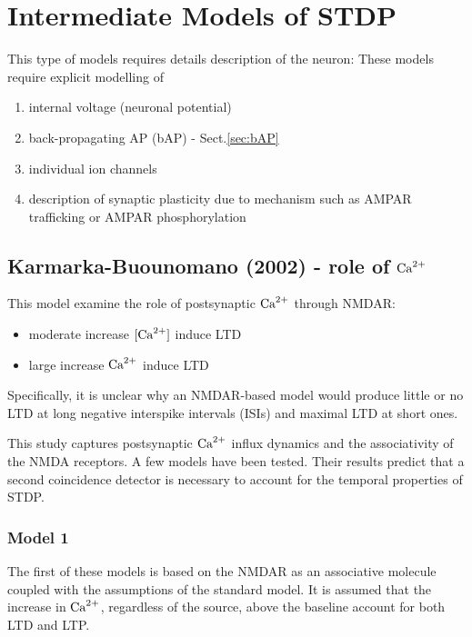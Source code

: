 \chapter{Intermediate Models of STDP}
\label{chap:ModelIntermediate_STDP}

This type of models requires details description of the neuron:
These models require explicit modelling of 
\begin{enumerate}
  \item internal voltage (neuronal potential)
  
  \item back-propagating AP (bAP) - Sect.\ref{sec:bAP}
  
  \item individual ion channels
  
  
  \item description of synaptic plasticity due to mechanism such as AMPAR
  trafficking or AMPAR phosphorylation
\end{enumerate}



\section{Karmarka-Buounomano (2002) - role of ${\text{Ca}^{2+}}$}
\label{sec:Karmarka-Buounomano-2002}


This model examine the role of postsynaptic ${\text{Ca}^{2+}}$ through NMDAR:
\begin{itemize}
  \item moderate increase $[{\text{Ca}^{2+}}]$ induce LTD
  \item large increase ${{\text{Ca}^{2+}}}$ induce LTD
\end{itemize}
Specifically, it is unclear why an NMDAR-based model would produce little or no
LTD at long negative interspike intervals (ISIs) and maximal LTD at short ones.


This study captures postsynaptic ${\text{Ca}^{2+}}$ influx dynamics and the associativity of
the NMDA receptors. A few models have been tested.
Their results predict that a second coincidence detector
is necessary to account for the temporal properties of STDP.

\subsection{Model 1}

The first of these models is based on the NMDAR as an associative molecule
coupled with the assumptions of the standard model.
It is assumed that the increase in ${\text{Ca}^{2+}}$, regardless of the source, above the
baseline account for both LTD and LTP.

